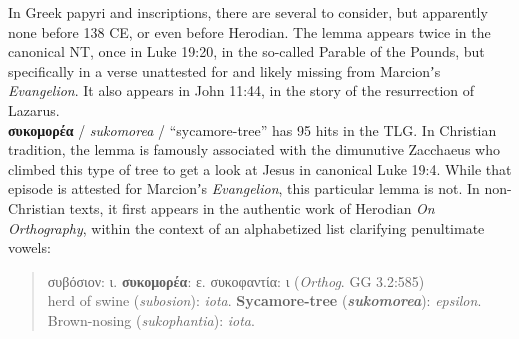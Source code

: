 In Greek papyri and inscriptions, there are several to consider, %
but apparently none before 138 CE, or even before Herodian.
The lemma appears twice in the canonical NT, %
once in Luke 19:20, in the so-called Parable of the Pounds, %
but specifically in a verse unattested for and likely missing from Marcionʼs \textit{Evangelion}. %
It also appears in John 11:44, in the story of the resurrection of Lazarus. \\[1mm] %

\noindent{}\textbf{συκομορέα} / \textit{sukomorea} / “sycamore-tree” %
has 95 hits in the TLG. %
In Christian tradition, the lemma is famously associated with the dimunutive Zacchaeus %
who climbed this type of tree to get a look at Jesus in canonical Luke 19:4. %
While that episode is attested for Marcionʼs \textit{Evangelion}, %
this particular lemma is not. %
In non-Christian texts, it first appears in the authentic work of Herodian \textit{On Orthography}, %
within the context of an alphabetized list clarifying penultimate vowels: %

\vspace*{1mm} 
 \begin{quote}συβόσιον: ι. \textbf{συκομορέα}: ε. συκοφαντία: ι (\textit{Orthog}. GG 3.2:585)\\[1mm] %
 herd of swine (\textit{subosion}): \textit{iota}. \textbf{Sycamore-tree} %
 (\textit{\textbf{sukomorea}}): \textit{epsilon}. Brown-nosing (\textit{sukophantia}): \textit{iota}.\end{quote} %
 \vspace*{1mm}
\noindent{} %

